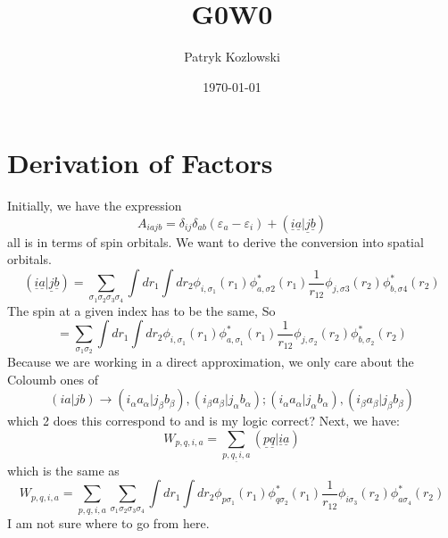 \documentclass[12pt]{article}
\author{Patryk Kozlowski}
\title{G0W0}
\date{\today}
\begin{document}
\maketitle
\section{Derivation of Factors}
Initially, we have the expression
\begin{equation}
    A_{iajb}=\delta _{ij} \delta _{ab} \left(\varepsilon _{a}-\varepsilon _{i}\right) + (\underline{i} \underline{a} | \underline{j} \underline{b} )
\end{equation}
all is in terms of spin orbitals. We want to derive the conversion into spatial orbitals. 
\begin{equation}
    (\underline{i} \underline{a} | \underline{j} \underline{b} ) = \sum_{\sigma _{1} \sigma _{2} \sigma _{3} \sigma _{4}} \int dr_{1} \int dr_{2} \phi _{i,\sigma _1}(r_{1}) \phi _{a,\sigma 2}^*(r_{1}) \frac{1}{r_{12}} \phi _{j,\sigma 3}(r_{2}) \phi _{b,\sigma 4}^*(r_{2})
\end{equation}
The spin at a given index has to be the same, So
\begin{equation}
    = \sum_{\sigma _{1} \sigma _{2}} \int dr_{1} \int dr_{2} \phi _{i,\sigma _1}(r_{1}) \phi _{a,\sigma _1}^*(r_{1}) \frac{1}{r_{12}} \phi _{j,\sigma _2}(r_{2}) \phi _{b,\sigma _2}^*(r_{2})
\end{equation}
Because we are working in a direct approximation, we only care about the Coloumb ones of
\begin{equation}
    (ia|jb) \rightarrow (i_{\alpha }a_{\alpha }|j_{\beta }b_{\beta }) , (i_{\beta }a_{\beta }|j_{\alpha }b_{\alpha }); (i_{\alpha }a_{\alpha }|j_{\alpha }b_{\alpha }) , (i_{\beta }a_{\beta }|j_{\beta }b_{\beta })
\end{equation}
which 2 does this correspond to and is my logic correct?
Next, we have:
\begin{equation}
    W_{p,q,i,a} = \sum_{\underline{p,q,i,a}} (\underline{p} \underline{q} | \underline{i} \underline{a} )
\end{equation}
which is the same as
\begin{equation}
    W_{p,q,i,a} = \sum_{p,q,i,a} \sum_{\sigma _{1} \sigma _{2} \sigma _{3} \sigma _{4}} \int dr_{1} \int dr_{2} \phi _{p \sigma _{1}}(r_{1}) \phi _{q \sigma _{2}}^*(r_{1}) \frac{1}{r_{12}} \phi _{i \sigma _{3}}(r_{2}) \phi _{a \sigma _{4}}^*(r_{2})
\end{equation}
I am not sure where to go from here.
\end{document}
